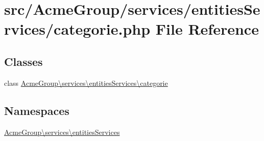 \hypertarget{services_2entities_services_2categorie_8php}{\section{src/\+Acme\+Group/services/entities\+Services/categorie.php File Reference}
\label{services_2entities_services_2categorie_8php}
}
\subsection*{Classes}
\begin{DoxyCompactItemize}
\item 
class \hyperlink{class_acme_group_1_1services_1_1entities_services_1_1categorie}{Acme\+Group\textbackslash{}services\textbackslash{}entities\+Services\textbackslash{}categorie}
\end{DoxyCompactItemize}
\subsection*{Namespaces}
\begin{DoxyCompactItemize}
\item 
 \hyperlink{namespace_acme_group_1_1services_1_1entities_services}{Acme\+Group\textbackslash{}services\textbackslash{}entities\+Services}
\end{DoxyCompactItemize}
